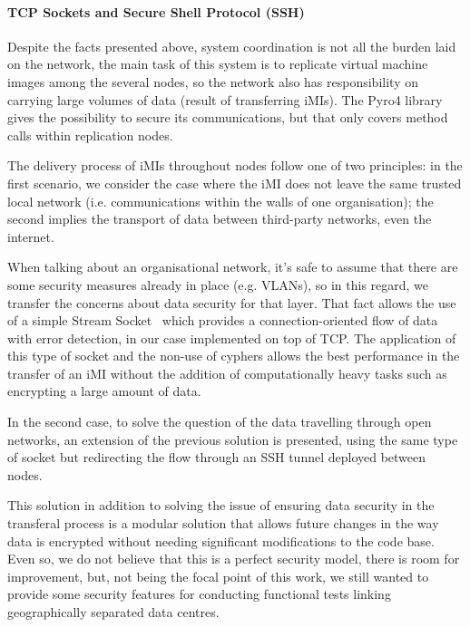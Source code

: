 \paragraph{TCP Sockets and Secure Shell Protocol (SSH)}
\label{par:impl_tcp_sockets_ssh}
Despite the facts presented above, system coordination is not all the burden laid on the network, the main task of this system is to replicate virtual machine images among the several nodes, so the network also has responsibility on carrying large volumes of data (result of transferring iMIs). The Pyro4 library gives the possibility to secure its communications, but that only covers method calls within replication nodes. 

The delivery process of iMIs throughout nodes follow one of two principles: in the first scenario, we consider the case where the iMI does not leave the same trusted local network (i.e. communications within the walls of one organisation); the second implies the transport of data between third-party networks, even the internet. 

When talking about an organisational network, it's safe to assume that there are some security measures already in place (e.g. VLANs), so in this regard, we transfer the concerns about data security for that layer. That fact allows the use of a simple Stream Socket~\cite{py_socks} which provides a connection-oriented flow of data with error detection, in our case implemented on top of TCP. The application of this type of socket and the non-use of cyphers allows the best performance in the transfer of an iMI without the addition of computationally heavy tasks such as encrypting a large amount of data.

In the second case, to solve the question of the data travelling through open networks, an extension of the previous solution is presented, using the same type of socket but redirecting the flow through an SSH tunnel deployed between nodes. 

This solution in addition to solving the issue of ensuring data security in the transferal process is a modular solution that allows future changes in the way data is encrypted without needing significant modifications to the code base. Even so, we do not believe that this is a perfect security model, there is room for improvement, but, not being the focal point of this work, we still wanted to provide some security features for conducting functional tests linking geographically separated data centres.



